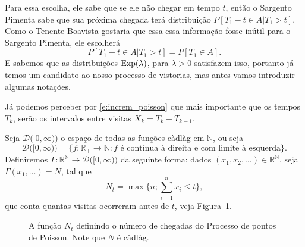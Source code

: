 \documentclass[../Notas_de_aula.tex]{subfiles}
\begin{document}
\begin{topics}
Para essa escolha, ele sabe que se ele não chegar em tempo $t$, então o Sargento Pimenta sabe que sua próxima chegada terá distribuição $P[T_1 - t \in A | T_1 > t]$.
Como o Tenente Boavista gostaria que essa essa informação fosse inútil para o Sargento Pimenta, ele escolherá
\begin{equation}
  P[T_1 - t \in A | T_1 > t] = P[T_1 \in A].
\end{equation}
E sabemos que as distribuições $\operatorname{Exp}(\lambda)$, para $\lambda > 0$ satisfazem isso, portanto já temos um candidato ao nosso processo de vistorias, mas antes vamos introduzir algumas notações.

Já podemos perceber por \eqref{e:increm_poisson} que mais importante que os tempos $T_k$, serão os intervalos entre visitas $X_k = T_k - T_{k-1}$.

Seja $\mathcal{D}\big( [0, \infty) \big)$ o espaço de todas as funções càdlàg em $\mathbb{N}$, ou seja
\begin{equation*}
  \mathcal{D}\big( [0, \infty) \big) = \big\{ f:\mathbb{R}_+ \to \mathbb{N}: f \text{ é contínua à direita e com limite à esquerda} \big\}.
\end{equation*}
Definiremos $\Gamma: \mathbb{R}^\mathbb{N} \to \mathcal{D}\big( [0, \infty) \big)$ da seguinte forma: dados $(x_1, x_2, \dots) \in \mathbb{R}^\mathbb{N}$, seja $\Gamma(x_1, \dots) = N$, tal que
\begin{equation}
  N_t = \max\{n; \sum_{i=1}^n x_i \leq t\},
\end{equation}
que conta quantas visitas ocorreram antes de $t$, veja Figura~\ref{f:ppp_reta}.

\begin{figure}[!ht]
  \centering
  \caption{A função $N_t$ definindo o número de chegadas do Processo de pontos de Poisson.
  Note que $N$ é càdlàg.\label{f:ppp_reta}}
\end{figure}


\end{topics}
\end{document}
